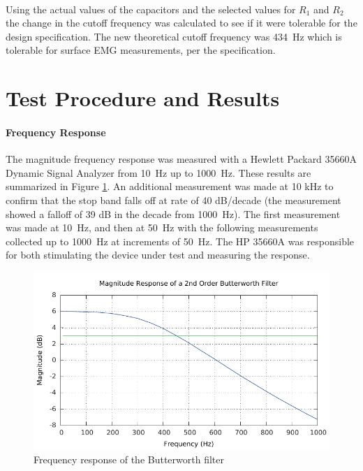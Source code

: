 \documentclass[justified]{tufte-handout}
\begin{document}
\paragraph{} Using the actual values of the capacitors and the selected values
for $R_1$ and $R_2$ the change in the cutoff frequency was calculated to see if
it were tolerable for the design specification. The new theoretical cutoff
frequency was 434~Hz which is tolerable for surface EMG measurements, per the
specification. 
\section{Test Procedure and Results}
\paragraph{Frequency Response} The magnitude frequency response was
measured with a Hewlett Packard 35660A Dynamic Signal Analyzer from 10~Hz up to
1000~Hz. These results are summarized in Figure \ref{freqr}. An additional
measurement was made at 10 kHz to confirm that the stop band falls off at rate
of 40 dB/decade (the measurement showed a falloff of 39 dB in the decade from
1000~Hz). The first measurement was made at 10~Hz, and then at 50~Hz with
the following measurements collected up to 1000~Hz at increments of 50~Hz. The
HP 35660A was responsible for both stimulating the device under test and
measuring the response.
\begin{figure}
\centering
\label{freqr}
\includegraphics[width=0.9\linewidth]{magResponse.pdf}
\caption{Frequency response of the Butterworth filter}
\end{figure}
\end{document}
